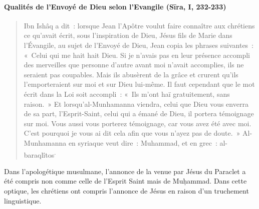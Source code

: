 \paragraph{Qualités de l'Envoyé de Dieu selon l'Evangile (Sīra, I,
232-233)}
\begin{quotation}
    

Ibn Ishâq a dit~: lorsque Jean l'Apôtre voulut faire connaître aux
chrétiens ce qu'avait écrit, sous l'inspiration de Dieu, Jésus fils de
Marie dans l'Évangile, au sujet de l'Envoyé de Dieu, Jean copia les
phrases suivantes~: «~Celui qui me hait hait Dieu. Si je n'avais pas en
leur présence accompli des merveilles que personne d'autre avant moi
n'avait accomplies, ils ne seraient pas coupables. Mais ils abusèrent de
la grâce et crurent qu'ils l'emporteraient sur moi et sur Dieu lui-même.
Il faut cependant que le mot écrit dans la Loi soit accompli~: «~Ils
m'ont haï gratuitement, sans raison.~» Et lorsqu'al-Munhamanna viendra,
celui que Dieu vous enverra de sa part, l'Esprit-Saint, celui qui a
émané de Dieu, il portera témoignage sur moi. Vous aussi vous porterez
témoignage, car vous avez été avec moi. C'est pourquoi je vous ai dit
cela afin que vous n'ayez pas de doute.~» Al-Munhamanna en syriaque veut
dire~: Muhammad, et en grec~:
al-baraqlîtos\textsuperscript{.}
\end{quotation}
Dans l'apologétique musulmane, l'annonce de la venue par Jésus du
Paraclet a été compris non comme celle de l'Esprit Saint mais de
Muḥammad. Dans cette optique, les chrétiens ont compris l'annonce de
Jésus en raison d'un truchement linguistique.


